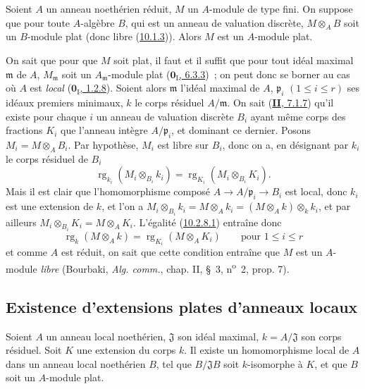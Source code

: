 \begin{proposition}[10.2.8]
\label{0.10.2.8-fr}
Soient $A$ un anneau noethérien réduit, $M$ un $A$-module de type fini. On
suppose que pour toute $A$-algèbre $B$, qui est un anneau de valuation
discrète, $M\otimes_A B$ soit un $B$-module plat (donc libre
\textup{(\hyperref[0.10.1.3-fr]{10.1.3}))}. Alors $M$ est un $A$-module plat.
\end{proposition}

On sait que pour que $M$ soit plat, il faut et il suffit que pour tout idéal
maximal $\mathfrak m$ de $A$, $M_{\mathfrak m}$ soit un
$A_{\mathfrak m}$-module plat
(\hyperref[0.6.3.3-fr]{$\mathbf{0}_{\mathrm I}$, 6.3.3})~; on peut donc se borner au cas
où $A$ est \emph{local} (\hyperref[0.1.2.8-fr]{$\mathbf{0}_{\mathrm I}$, 1.2.8}).
Soient alors $\mathfrak m$ l'idéal maximal de $A$, $\mathfrak p_i$
$(1\leq i\leq r)$ ses idéaux premiers minimaux, $k$ le corps résiduel
$A/\mathfrak m$. On sait (\hyperref[II.7.1.7-fr]{\textbf{II}, 7.1.7}) qu'il existe
pour chaque $i$ un anneau de valuation discrète $B_i$ ayant même corps des
fractions $K_i$ que l'anneau intègre $A/\mathfrak p_i$, et dominant ce
dernier. Posons $M_i=M\otimes_A B_i$. Par hypothèse, $M_i$ est libre sur
$B_i$, donc on a, en désignant par $k_i$ le corps résiduel de $B_i$
\[
\label{0.10.2.8.1-fr}
  \operatorname{rg}_{k_i}(M_i\otimes_{B_i}k_i)
  =\operatorname{rg}_{K_i}(M_i\otimes_{B_i}K_i).
  \tag{10.2.8.1}
\]
Mais il est clair que l'homomorphisme composé
$A\to A/\mathfrak p_i\to B_i$ est local, donc $k_i$ est une extension de $k$,
et l'on a
$M_i\otimes_{B_i}k_i=M\otimes_A k_i=(M\otimes_A k)\otimes_k k_i$, et par
ailleurs $M_i\otimes_{B_i}K_i=M\otimes_A K_i$. L'égalité
(\hyperref[0.10.2.8.1-fr]{10.2.8.1}) entraîne donc
\[
  \operatorname{rg}_k(M\otimes_A k)=\operatorname{rg}_{K_i}(M\otimes_A K_i)
  \qquad\text{pour }1\leq i\leq r
\]
et comme $A$ est réduit, on sait que cette condition entraîne que $M$ est un
$A$-module \emph{libre} (Bourbaki, \emph{Alg. comm.}, chap. II, \S~3,
n\textsuperscript{o}~2, prop. 7).

\subsection{Existence d'extensions plates d'anneaux locaux}
\label{subsection:0.10.3-fr}

\begin{proposition}[10.3.1]
\label{0.10.3.1-fr}
Soient $A$ un anneau local noethérien, $\mathfrak J$ son idéal maximal,
$k=A/\mathfrak J$ son corps résiduel. Soit $K$ une extension du corps $k$. Il
existe un homomorphisme local de $A$ dans un anneau local noethérien $B$, tel
que $B/\mathfrak J B$ soit $k$-isomorphe à $K$, et que $B$ soit un
$A$-module plat.
\end{proposition}


